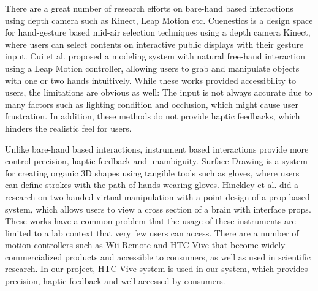 There are a great number of research efforts \cite{walter2014cuenesics,cui2016exploration,ramani2015gesture,murugappan2013handy,han2014virtual} on bare-hand based interactions using depth camera such as Kinect, Leap Motion etc.
Cuenestics \cite{walter2014cuenesics} is a design space for hand-gesture based mid-air selection techniques using a depth camera Kinect, where users can select contents on interactive public displays with their gesture input.
Cui et al. \cite{cui2016exploration} proposed a modeling system with natural free-hand interaction using a Leap Motion controller, allowing users to grab and manipulate objects with one or two hands intuitively.
While these works provided accessibility to users, the limitations are obvious as well: The input is not always accurate due to many factors such as lighting condition and occlusion, which might cause user frustration.
In addition, these methods do not provide haptic feedbacks, which hinders the realistic feel for users.

Unlike bare-hand based interactions, instrument based interactions provide more control precision, haptic feedback and unambiguity.
Surface Drawing \cite{schkolne2001surface} is a system for creating organic 3D shapes using tangible tools such as gloves, where users can define strokes with the path of hands wearing gloves.
Hinckley et al. \cite{hinckley1998two} did a research on two-handed virtual manipulation with a point design of a prop-based system, which allows users to view a cross section of a brain with interface props.
These works have a common problem that the usage of these instruments are limited to a lab context that very few users can access.
There are a number of motion controllers such as Wii Remote \cite{wingcrave2010wii} and HTC Vive \cite{niehorster2017accuracy} that become widely commercialized products and accessible to consumers, as well as used in scientific research.
In our project, HTC Vive system is used in our system, which provides precision, haptic feedback and well accessed by consumers.

